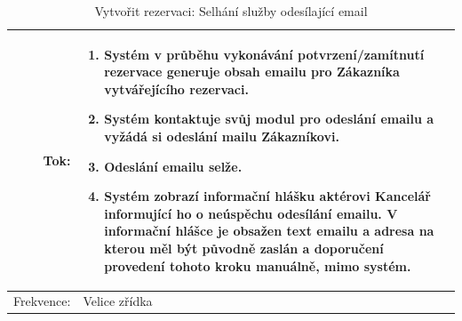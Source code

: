 \begin{center}
\begin{table}[ht!]
{\begin{tabular}{| r | p{12cm} |}
    \hline
    Tok: & 
    \begin{minipage}[t]{0.75\textwidth}
    	\begin{enumerate}[nosep,after=\strut]
            \item Systém v průběhu vykonávání potvrzení/zamítnutí rezervace generuje obsah emailu pro Zákazníka vytvářejícího rezervaci.
            \item Systém kontaktuje svůj modul pro odeslání emailu a vyžádá si odeslání mailu Zákazníkovi.
            \item Odeslání emailu selže.
            \item Systém zobrazí informační hlášku aktérovi Kancelář informující ho o neúspěchu odesílání emailu. V informační hlášce je obsažen text emailu a adresa na kterou měl být původně zaslán a doporučení provedení tohoto kroku manuálně, mimo systém.
    	\end{enumerate}
  	\end{minipage} \\
    \hline
    Frekvence: & Velice zřídka \\
    \hline

\end{tabular}}
\caption{Vytvořit rezervaci: Selhání služby odesílající email}
\label{table:4}
\end{table}
\end{center}

